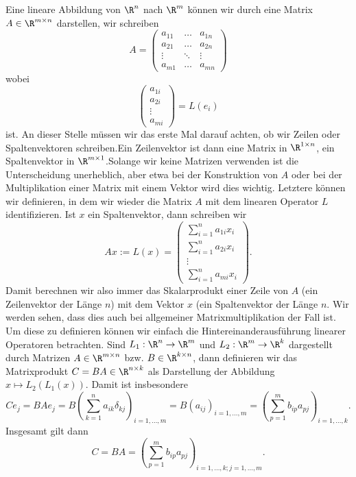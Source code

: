 \documentclass[letterpaper,10pt,english]{jupyterBook}
\begin{document}
Eine lineare Abbildung von \(\R^n\) nach \(\R^m\) können wir durch eine Matrix \(A \in \R^{m \times n}\) darstellen, wir schreiben
\begin{equation*}
 A = \left( \begin{array}{ccc} a_{11} &\ldots& a_{1n} \\ a_{21} &\ldots &a_ {2n} \\ \vdots &\ddots &\vdots \\ a_{m1} &\ldots& a_{mn} \end{array} \right)
\end{equation*}
wobei
\begin{equation*}
 \left( \begin{array}{c} a_{1i} \\ a_{2i}  \\ \vdots \\ a_{mi}  \end{array} \right) = L(e_i)
\end{equation*}
ist. An dieser Stelle müssen wir das erste Mal darauf achten, ob wir Zeilen  oder Spaltenvektoren schreiben.Ein Zeilenvektor ist dann eine Matrix in \(\R^{1 \times n}\), ein Spaltenvektor in \(\R^{m \times 1}\).Solange wir keine Matrizen verwenden ist die Unterscheidung unerheblich, aber etwa bei der Konstruktion von \(A\) oder bei der Multiplikation einer Matrix mit einem Vektor wird dies wichtig. Letztere können wir definieren, in dem wir wieder die Matrix \(A\) mit dem linearen Operator \(L\) identifizieren. Ist \(x\) ein Spaltenvektor, dann schreiben wir
\begin{equation*}
 A x := L(x) = \left( \begin{array}{c} \sum_{i=1}^n a_{1i} x_i \\ \sum_{i=1}^n a_{2i} x_i \\ \vdots \\ \sum_{i=1}^n a_{mi} x_i  \end{array} \right) .
\end{equation*}
Damit berechnen wir also immer das Skalarprodukt einer Zeile von \(A\) (ein Zeilenvektor der Länge \(n\)) mit dem Vektor \(x\) (ein Spaltenvektor der Länge \(n\). Wir werden sehen, dass dies auch bei allgemeiner Matrixmultiplikation der Fall ist. Um diese zu definieren können wir einfach die Hintereinanderausführung linearer Operatoren betrachten. Sind \(L_1: \R^n \rightarrow \R^m\) und  \(L_2: \R^m \rightarrow \R^k\) dargestellt durch Matrizen \(A \in \R^{m \times n}\) bzw. \(B \in \R^{k \times n}\), dann definieren wir das Matrixprodukt \(C = BA \in \R^{n \times k}\) als Darstellung der Abbildung \(x \mapsto L_2(L_1(x))\). Damit ist insbesondere
\begin{equation*}
 C e_j = BAe_j = B (\sum_{k=1}^n a_{ik} \delta_{kj})_{i=1,\ldots,m} = B (a_{ij})_{i=1,\ldots,m} = (\sum_{p=1}^m b_{ip} a_{pj})_{i=1,\ldots,k}.
\end{equation*}
Insgesamt gilt dann
\begin{equation*}
 C = BA =  (\sum_{p=1}^m b_{ip} a_{pj})_{i=1,\ldots,k; j=1,\ldots,m} .
\end{equation*}
\end{document}
